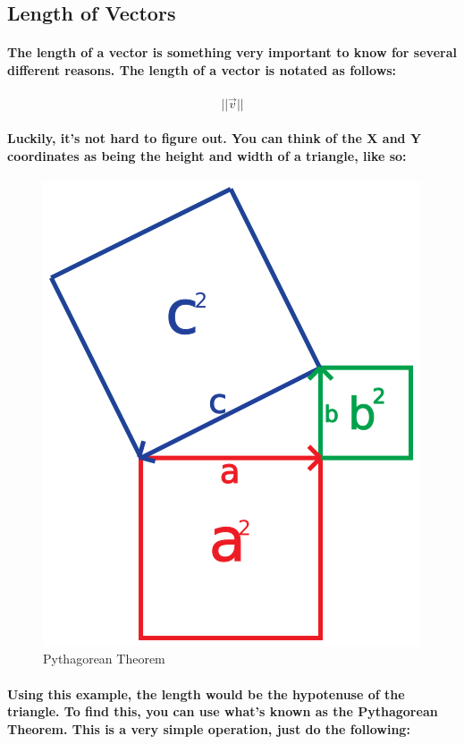 \subsection{\textsf{Length of Vectors}}
\paragraph{
    The length of a vector is something very important to know for several different reasons. The length of a vector is notated as follows:
}

\paragraph{
    \begin{equation*}
    ||\vec{v} ||
    \end{equation*}
}

\paragraph{
    Luckily, it's not hard to figure out. You can think of the X and Y coordinates as being the height and width of a triangle, like so:
}

\begin{frame}{}
    \begin{figure}[ht]
      \centering
      \includegraphics[width=0.5\linewidth]{images/chap2/PythagoreanTheorem.png}
      \caption{Pythagorean Theorem}
      \label{fig:pythagorean_theorem}
    \end{figure}
\end{frame}

\paragraph{
    Using this example, the length would be the hypotenuse of the triangle. To find this, you can use what's known as the Pythagorean Theorem. This is a very simple operation, just do the following:
}

